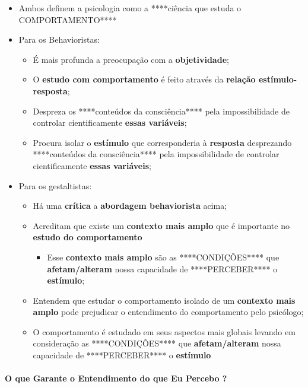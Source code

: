 \documentclass[
]{book}
\providecommand{\tightlist}{%
  \setlength{\itemsep}{0pt}\setlength{\parskip}{0pt}}
\begin{document}
\begin{itemize}
\tightlist
\item
  Ambos definem a psicologia como a ****ciência que estuda o COMPORTAMENTO****
\item
  Para os Behavioristas:

  \begin{itemize}
  \tightlist
  \item
    É mais profunda a preocupação com a \textbf{objetividade};
  \item
    O \textbf{estudo com comportamento} é feito através da \textbf{relação estímulo-resposta};
  \item
    Despreza os ****conteúdos da consciência**** pela impossibilidade de controlar cientificamente \textbf{essas variáveis};
  \item
    Procura isolar o \textbf{estímulo} que corresponderia à \textbf{resposta} desprezando ****conteúdos da consciência**** pela impossibilidade de controlar cientificamente \textbf{essas variáveis};
  \end{itemize}
\item
  Para os gestaltistas:

  \begin{itemize}
  \tightlist
  \item
    Há uma \textbf{crítica} a \textbf{abordagem behaviorista} acima;
  \item
    Acreditam que existe um \textbf{contexto mais amplo} que é importante no \textbf{estudo do comportamento}

    \begin{itemize}
    \tightlist
    \item
      Esse \textbf{contexto mais amplo} são as ****CONDIÇÕES**** que \textbf{afetam/alteram} nossa capacidade de ****PERCEBER**** o \textbf{estímulo};
    \end{itemize}
  \item
    Entendem que estudar o comportamento isolado de um \textbf{contexto mais amplo} pode prejudicar o entendimento do comportamento pelo psicólogo;
  \item
    O comportamento é estudado em seus aspectos mais globais levando em consideração as ****CONDIÇÕES**** que \textbf{afetam/alteram} nossa capacidade de ****PERCEBER**** o \textbf{estímulo}
  \end{itemize}
\end{itemize}

\hypertarget{o-que-garante-o-entendimento-do-que-eu-percebo}{%
\paragraph{O que Garante o Entendimento do que Eu Percebo ?}\label{o-que-garante-o-entendimento-do-que-eu-percebo}}
\end{document}
